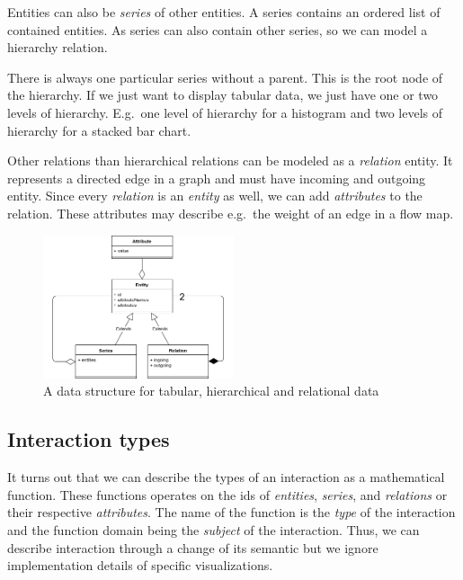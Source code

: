 \documentclass{article}
\begin{document}
Entities can also be \emph{series} of other entities.
A series contains an ordered list of contained entities.
As series can also contain other series, so we can model a hierarchy relation.

There is always one particular series without a parent.
This is the root node of the hierarchy.
If we just want to display tabular data, we just have one or two levels of hierarchy.
E.g.\ one level of hierarchy for a histogram and two levels of hierarchy for a stacked bar chart.

Other relations than hierarchical relations can be modeled as a \emph{relation} entity.
It represents a directed edge in a graph and must have incoming and outgoing entity.
Since every \emph{relation} is an \emph{entity} as well, we can add \emph{attributes} to the relation.
These attributes may describe e.g.\ the weight of an edge in a flow map.


\begin{figure}[h!]
  \centering
  \includegraphics[width=0.5\textwidth]{images/meta-data-structure.png}
  \caption{%
    A data structure for tabular, hierarchical and relational data
  }\label{fig:concept:meta-data-structure}
\end{figure}

\subsection{Interaction types}\label{sec:concept:types}

It turns out that we can describe the types of an interaction as a mathematical function.
These functions operates on the ids of \emph{entities}, \emph{series}, and \emph{relations} or their respective \emph{attributes}.
The name of the function is the \emph{type} of the interaction and the function domain being the \emph{subject} of the interaction.
Thus, we can describe interaction through a change of its semantic but we ignore implementation details of specific visualizations.
\end{document}

